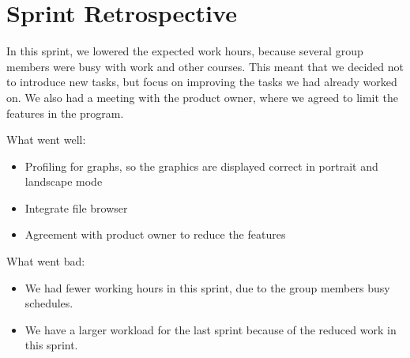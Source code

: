 \section{Sprint Retrospective} %
\label{sec:Sprint Retrospective}

In this sprint, we lowered the expected work hours, because several group members were busy with work and other courses. This meant that we decided not to introduce new tasks, but focus on improving the tasks we had already worked on.
We also had a meeting with the product owner, where we agreed to limit the features in the program.

What went well:

\begin{itemize}
\item Profiling for graphs, so the graphics are displayed correct in portrait and landscape mode

\item Integrate file browser

\item Agreement with product owner to reduce the features
\end{itemize}
What went bad:
\begin{itemize}
\item We had fewer working hours in this sprint, due to the group members busy schedules.

\item We have a larger workload for the last sprint because of the reduced work in this sprint.

\end{itemize}
